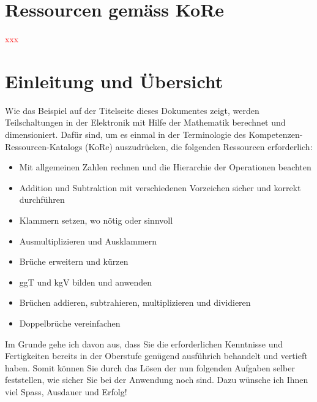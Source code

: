 \documentclass[11pt, a4paper, twoside, fleqn]{article}
\begin{document}

\section{Ressourcen gemäss KoRe}
\textcolor{red}{xxx}

\section{Einleitung und Übersicht}
Wie das Beispiel auf der Titelseite dieses Dokumentes zeigt, werden Teilschaltungen in der Elektronik mit Hilfe der Mathematik berechnet und dimensioniert. Dafür sind, um es einmal in der Terminologie des Kompetenzen-Ressourcen-Katalogs (KoRe) auszudrücken, die folgenden Ressourcen erforderlich:
\begin{itemize}%
\setlength{\itemsep}{0pt}
\item Mit allgemeinen Zahlen rechnen und die Hierarchie der Operationen beachten
\item Addition und Subtraktion mit verschiedenen Vorzeichen sicher und korrekt durchführen
\item Klammern setzen, wo nötig oder sinnvoll
\item Ausmultiplizieren und Ausklammern
\item Brüche erweitern und kürzen
\item ggT und kgV bilden und anwenden
\item Brüchen addieren, subtrahieren, multiplizieren und dividieren
\item Doppelbrüche vereinfachen
\end{itemize} 
Im Grunde gehe ich davon aus, dass Sie die erforderlichen Kenntnisse und Fertigkeiten bereits in der Oberstufe genügend ausführich behandelt und vertieft haben. Somit können Sie durch das Lösen der nun folgenden Aufgaben selber feststellen, wie sicher Sie bei der Anwendung noch sind. Dazu wünsche ich Ihnen viel Spass, Ausdauer und Erfolg!
\end{document}
